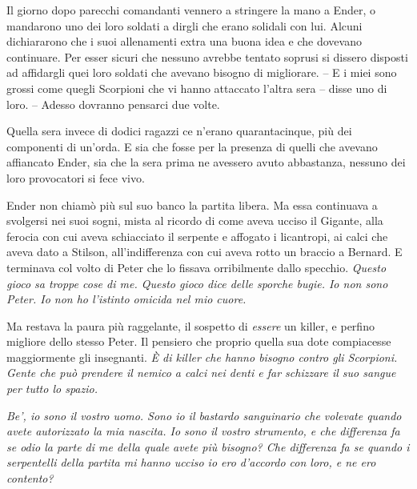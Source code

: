 {Il giorno dopo parecchi comandanti vennero a stringere la mano a Ender,
	o mandarono uno dei loro soldati a dirgli che erano solidali con lui.
	Alcuni dichiararono che i suoi allenamenti extra una buona idea e che
	dovevano continuare. Per esser sicuri che nessuno avrebbe tentato
	soprusi si dissero disposti ad affidargli quei loro soldati che avevano
	bisogno di migliorare. -- E i miei sono grossi come quegli Scorpioni che
	vi hanno attaccato l'altra sera -- disse uno di loro. -- Adesso dovranno
	pensarci due volte.}

{Quella sera invece di dodici ragazzi ce n'erano quarantacinque, più dei
	componenti di un'orda. E sia che fosse per la presenza di quelli che
	avevano affiancato Ender, sia che la sera prima ne avessero avuto
	abbastanza, nessuno dei loro provocatori si fece vivo.}

{Ender non chiamò più sul suo banco la partita libera. Ma essa
	continuava a svolgersi nei suoi sogni, mista al ricordo di come aveva
	ucciso il Gigante, alla ferocia con cui aveva schiacciato il serpente e
	affogato i licantropi, ai calci che aveva dato a Stilson,
	all'indifferenza con cui aveva rotto un braccio a Bernard. E terminava
	col volto di Peter che lo fissava orribilmente dallo specchio.
	\emph{Questo gioco sa troppe cose di me. Questo gioco dice delle sporche
		bugie. Io non sono Peter. Io non ho l'istinto omicida nel mio cuore.}}

{Ma restava la paura più raggelante, il sospetto di \emph{essere} un
	killer, e perfino migliore dello stesso Peter. Il pensiero che proprio
	quella sua dote compiacesse maggiormente gli insegnanti. \emph{È di
		killer che hanno bisogno contro gli Scorpioni. Gente che può prendere il
		nemico a calci nei denti e far schizzare il suo sangue per tutto lo
		spazio.}}

\emph{{Be', io sono il vostro uomo. Sono io il bastardo sanguinario che
		volevate quando avete autorizzato la mia nascita. Io sono il vostro
		strumento, e che differenza fa se odio la parte di me della quale avete
		più bisogno? Che differenza fa se quando i serpentelli della partita mi
		hanno ucciso io ero d'accordo con loro, e ne ero contento?}}

\label{Orsonux20Scottux20Cardux20-ux20Ilux20Giocoux20Diux20Enderux20-ux20BY_SLY70A1_split_011.htm}{}

